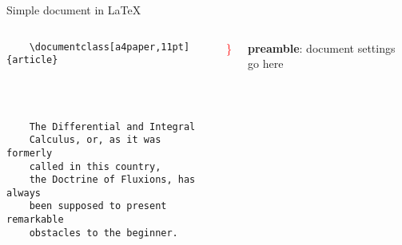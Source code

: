 \copyrightTim

\begin{frame}[fragile, t]{Simple document in \LaTeX}
	\begin{columns}
        \begin{column}{0.5\textwidth}
	\begin{verbatim} 
	\documentclass[a4paper,11pt]{article}

		
	

	The Differential and Integral 
	Calculus, or, as it was formerly 
	called in this country, 
	the Doctrine of Fluxions, has always 
	been supposed to present remarkable 
	obstacles to the beginner.

	
	\end{verbatim}
\end{column}
\begin{column}{0.05\textwidth}
	{\Huge \textcolor{red}{ \} } }
	\\[2cm]
	\phantom{{\Huge \textcolor{red}{ \} } }}
	
\end{column}
\begin{column}{0.3\textwidth}
	\textbf{preamble}: document settings go here
	\\[2cm]
\end{column}
\end{columns}

\end{frame}
